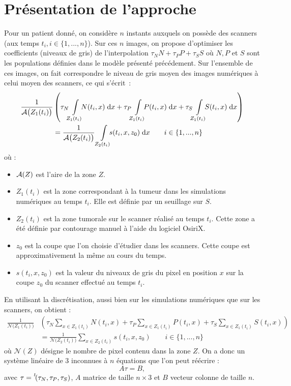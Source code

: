 \documentclass[main.tex]{subfiles}
\begin{document}
\section{Présentation de l'approche}
Pour un patient donné, on considère $n$ instants auxquels on possède des scanners (aux temps $t_i, i\in \{ 1,...,n \}$). Sur ces $n$ images, on propose d'optimiser les coefficients (niveaux de gris) de l'interpolation $\tau_N N + \tau_P P + \tau_S S$ où $N, P$ et $S$ sont les populations définies dans le modèle présenté précédement. Sur l'ensemble de ces images, on fait correspondre le niveau de gris moyen des images numériques à celui moyen des scanners, ce qui s'écrit~:
\begin{equation}
\label{eq:optim_grey_integ_aire}
\begin{aligned}
\frac{1}{\aire\big(Z_1(t_i)\big)}&\left( \tau_N\intperso{Z_1(t_i)}N(t_i,x) \dx + \tau_P\intperso{Z_1(t_i)}P(t_i,x) \dx + \tau_S\intperso{Z_1(t_i)} S(t_i,x) \dx \right) \\
&= \frac{1}{\aire\big(Z_2(t_i)\big)} \ \intperso{Z_2(t_i)} s(t_i,x,z_0) \dx \qquad i \in \{1,...,n\}
\end{aligned}
\end{equation}
où : \begin{itemize}
\item $\mathcal{A}(Z)$ est l'aire de la zone $Z$.
\item $Z_1(t_i)$ est la zone correspondant à la tumeur dans les simulations numériques au temps $t_i$. Elle est définie par un seuillage sur $S$.
\item $Z_2(t_i)$ est la zone tumorale sur le scanner réalisé au temps $t_i$. Cette zone a été définie par contourage manuel à l'aide du logiciel OsiriX.
\item $z_0$ est la coupe que l'on choisie d'étudier dans les scanners. Cette coupe est approximativement la même au cours du temps.
\item $s(t_i,x,z_0)$ est la valeur du niveaux de gris du pixel en position $x$ sur la coupe $z_0$ du scanner effectué au temps $t_i$.
\end{itemize}
En utilisant la discrétisation, aussi bien sur les simulations numériques que sur les scanners, on obtient :
\begin{equation}
\label{eq:optim_grey_eq_discr}
\begin{aligned}
\frac{1}{\mathcal{N}\big(Z_1(t_i)\big)}&\left( \tau_N\!\!\sum_{x\in Z_1(t_i)}\!\!N(t_i,x) + \tau_P\!\!\sum_{x\in Z_1(t_i)}\!\!P(t_i,x) + \tau_S\!\!\sum_{x\in Z_1(t_i)}\!\!S(t_i,x) \right) \\
&= \frac{1}{\mathcal{N}\big(Z_2(t_i)\big)} \sum_{x\in Z_2(t_i)}\!\! s(t_i,x,z_0) \qquad i \in \{1,...,n\}
\end{aligned}
\end{equation}
où $\mathcal{N}(Z)$ désigne le nombre de pixel contenu dans la zone $Z$. On a donc un système linéaire de 3 inconnues à $n$ équations que l'on peut réécrire :
\begin{equation} \label{eq:Atau_egal_B}
A\tau=B,
\end{equation}
avec $\tau= \prescript{\mathit{t\!}}{}{(}\tau_N,\tau_P,\tau_S)$, $A$ matrice de taille $n\times 3$ et $B$ vecteur colonne de taille $n$.
\end{document}
